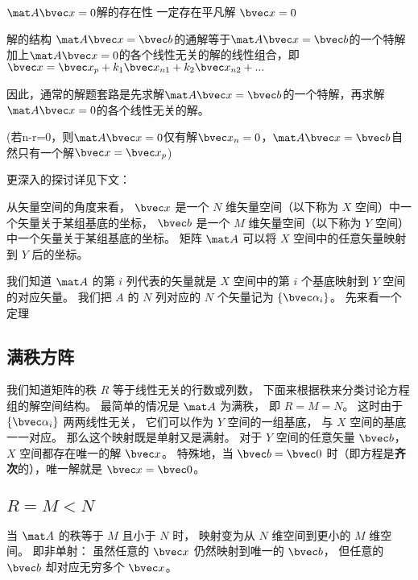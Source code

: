 \begin{theorem}{$\mat A \bvec x=0$解的存在性}
一定存在平凡解 $\bvec x=0$
\end{theorem}

\begin{theorem}{解的结构}
$\mat A \bvec x=\bvec b$的通解等于$\mat A \bvec x=\bvec b$的一个特解加上$\mat A \bvec x=0$的各个线性无关的解的线性组合，即$\bvec x = \bvec x_p +k_1\bvec x_{n1}+k_2\bvec x_{n2}+...$

因此，通常的解题套路是先求解$\mat A \bvec x=\bvec b$的一个特解，再求解$\mat A \bvec x=0$的各个线性无关的解。

(若n-r=0，则$\mat A \bvec x=0$仅有解$\bvec x_n=0$，$\mat A \bvec x=\bvec b$自然只有一个解$\bvec x = \bvec x_p$)
\end{theorem}

更深入的探讨详见下文：

从矢量空间的角度来看， $\bvec x$ 是一个 $N$ 维矢量空间（以下称为 $X$ 空间）中一个矢量关于某组基底的坐标， $\bvec b$ 是一个 $M$ 维矢量空间（以下称为 $Y$ 空间）中一个矢量关于某组基底的坐标。 矩阵 $\mat A$ 可以将 $X$ 空间中的任意矢量映射到 $Y$ 后的坐标。

我们知道 $\mat A$ 的第 $i$ 列代表的矢量就是 $X$ 空间中的第 $i$ 个基底映射到 $Y$ 空间的对应矢量。 我们把 $A$ 的 $N$ 列对应的 $N$ 个矢量记为 $\{\bvec \alpha_i\}$。 先来看一个定理

\subsection{满秩方阵}
我们知道矩阵的秩 $R$ 等于线性无关的行数或列数， 下面来根据秩来分类讨论方程组的解空间结构。 最简单的情况是 $\mat A$ 为满秩， 即 $R = M = N$。 这时由于 $\{\bvec \alpha_i\}$ 两两线性无关， 它们可以作为 $Y$ 空间的一组基底， 与 $X$ 空间的基底一一对应。 那么这个映射既是单射又是满射。%
对于 $Y$ 空间的任意矢量 $\bvec b$， $X$ 空间都存在唯一的解 $\bvec x$。 特殊地，当 $\bvec b = \bvec 0$ 时（即方程是\textbf{齐次}的），唯一解就是 $\bvec x = \bvec 0$。

\subsection{$R = M < N$}\label{sub_LinEq_1}

当 $\mat A$ 的秩等于 $M$ 且小于 $N$ 时， 映射变为从 $N$ 维空间到更小的 $M$ 维空间。 即非单射： 虽然任意的 $\bvec x$ 仍然映射到唯一的 $\bvec b$， 但任意的 $\bvec b$ 却对应无穷多个 $\bvec x$。 

